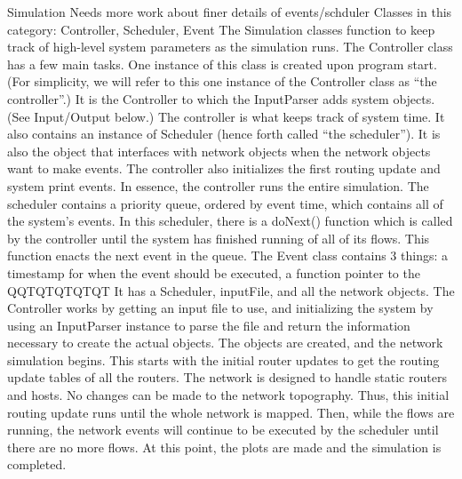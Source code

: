 Simulation Needs more work about finer details of events/schduler 
    Classes in this category: Controller, Scheduler, Event
    The Simulation classes function to keep track of high-level system parameters as the simulation runs. 
The Controller class has a few main tasks. One instance of this class is created upon program start. (For simplicity, we will refer to this one instance of the Controller class as “the controller”.) It is the Controller to which the InputParser adds system objects. (See Input/Output below.) The controller is what keeps track of system time. It also contains an instance of Scheduler (hence forth called “the scheduler”). It is also the object that interfaces with network objects when the network objects want to make events. The controller also initializes the first routing update and system print events. In essence, the controller runs the entire simulation.
The scheduler contains a priority queue, ordered by event time, which contains all of the system’s events. In this scheduler, there is a doNext() function which is called by the controller until the system has finished running of all of its flows. This function enacts the next event in the queue. 
The Event class contains 3 things: a timestamp for when the event should be executed, a function pointer to the QQTQTQTQTQT
It has a Scheduler, inputFile, and all the network objects. The Controller works by getting an input file to use, and initializing the system by using an InputParser instance to parse the file and return the information necessary to create the actual objects. The objects are created, and the network simulation begins. This starts with the initial router updates to get the routing update tables of all the routers. The network is designed to handle static routers and hosts. No changes can be made to the network topography. Thus, this initial routing update runs until the whole network is mapped. Then, while the flows are running, the network events will continue to be executed by the scheduler until there are no more flows. At this point, the plots are made and the simulation is completed.

